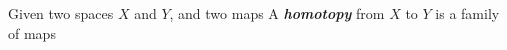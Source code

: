 \documentclass[preview]{standalone}
\begin{document}
\begin{center}
Given two spaces $X$ and $Y$, and two maps A \textbf{\textit{homotopy}} from $X$ to $Y$ is a family of maps
\end{center}
\end{document}
